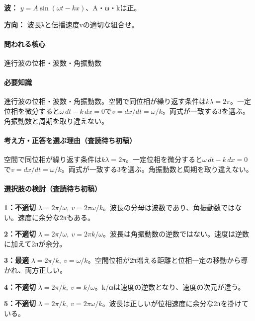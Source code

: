 \noindent\textbf{波：} \(y=A\sin(\omega t-kx)\)、A・ω・kは正。\par

\noindent\textbf{方向：} 波長λと伝播速度vの適切な組合せ。\par

\paragraph{問われる核心} 進行波の位相・波数・角振動数

\paragraph{必要知識} 進行波の位相・波数・角振動数。空間で同位相が繰り返す条件は\(k\lambda=2\pi\)。一定位相を微分すると\(\omega\,dt-k\,dx=0\)で\(v=dx/dt=\omega/k\)。両式が一致する3を選ぶ。角振動数と周期を取り違えない。

\paragraph{考え方・正答を選ぶ理由（査読待ち初稿）} 空間で同位相が繰り返す条件は\(k\lambda=2\pi\)。一定位相を微分すると\(\omega\,dt-k\,dx=0\)で\(v=dx/dt=\omega/k\)。両式が一致する3を選ぶ。角振動数と周期を取り違えない。

\paragraph{選択肢の検討（査読待ち初稿）}\mbox{}\par

\noindent\textbf{1：不適切} \(\lambda=2\pi/\omega,\ v=2\pi\omega/k\)。波長の分母は波数であり、角振動数ではない。速度に余分な2πもある。\par

\noindent\textbf{2：不適切} \(\lambda=2\pi/\omega,\ v=2\pi k/\omega\)。波長は角振動数の逆数ではない。速度は逆数に加えて2πが余分。\par

\noindent\textbf{3：最適} \(\lambda=2\pi/k,\ v=\omega/k\)。空間位相が2π増える距離と位相一定の移動から導かれ、両方正しい。\par

\noindent\textbf{4：不適切} \(\lambda=2\pi/k,\ v=k/\omega\)。k/ωは速度の逆数となり、速度の次元が違う。\par

\noindent\textbf{5：不適切} \(\lambda=2\pi/k,\ v=2\pi\omega/k\)。波長は正しいが位相速度に余分な2πを掛けている。\par

